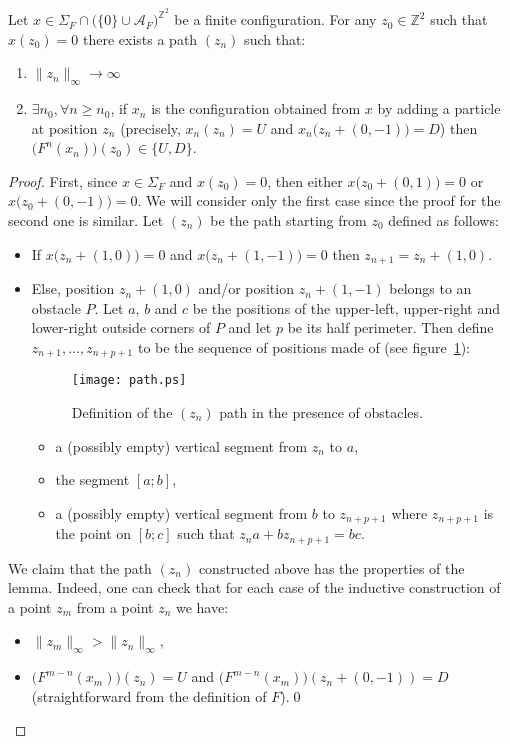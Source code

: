 \documentclass{llncs}
\newcommand{\zz}{{\mathbb{Z}^2}}
\newcommand{\A}{\mathcal{A}}
\newcommand{\acf}{F}
\newcommand{\obst}{\Sigma_{\acf}}
\newcommand{\obstset}{\A_F}
\begin{document}
\begin{lemma}
  \label{lem:partattack}
  Let ${x\in\obst\cap\bigl(\{0\}\cup\obstset\bigr)^\zz}$ be a finite
  configuration. For any $z_0\in\zz$ such that $x(z_0)=0$ there exists
  a path ${(z_n)}$ such that:
  \begin{enumerate}
  \item ${\|z_n\|_\infty\rightarrow\infty}$
  \item ${\exists n_0,\forall n\geq n_0}$, if $x_n$ is the
    configuration obtained from $x$ by adding a particle at position
    $z_n$ (precisely, ${x_n(z_n)=U}$ and
    ${x_n\bigl(z_n+(0,-1)\bigr)=D}$) then
    ${\bigl(\acf^n(x_n)\bigr)(z_0)\in\{U,D\}}$.
  \end{enumerate}
\end{lemma}
\begin{proof}
  First, since $x\in\obst$ and $x(z_0)=0$, then either
  ${x\bigl(z_0+(0,1)\bigr)=0}$ or ${x\bigl(z_0+(0,-1)\bigr)=0}$. We
  will consider only the first case since the proof for the second one
  is similar. Let $(z_n)$ be the path starting from $z_0$ defined as
  follows:
  \begin{itemize}
  \item If $x\bigl(z_n+(1,0)\bigr)=0$ and $x\bigl(z_n+(1,-1)\bigr)=0$ then ${z_{n+1}=z_n+(1,0)}$.
  \item Else, position $z_n+(1,0)$ and/or position $z_n+(1,-1)$
    belongs to an obstacle $P$.  Let $a$, $b$ and $c$ be the positions
    of the upper-left, upper-right and lower-right outside corners of
    $P$ and let $p$ be its half perimeter. Then define
    ${z_{n+1},\ldots,z_{n+p+1}}$ to be the sequence of positions made
    of (see figure~\ref{fig:thepath}):

    \begin{figure}
      \centering
      \texttt{[image: path.ps]}
      \caption{Definition of the $(z_n)$ path in the presence of obstacles.}
      \label{fig:thepath}
    \end{figure}
    \begin{itemize}
    \item a (possibly empty) vertical segment from $z_n$ to $a$,
    \item the segment $[a;b]$,
    \item a (possibly empty) vertical segment from $b$ to $z_{n+p+1}$
      where $z_{n+p+1}$ is the point on $[b;c]$ such that ${z_na +
        bz_{n+p+1}=bc}$.
    \end{itemize}
  \end{itemize}
  We claim that the path $(z_n)$ constructed above has the properties
  of the lemma. Indeed, one can check that for each case of the
  inductive construction of a point $z_m$ from a point $z_n$ we have:
  \begin{itemize}
  \item ${\|z_m\|_\infty>\|z_n\|_\infty}$,
  \item ${\bigl(\acf^{m-n}(x_m)\bigr)(z_n)=U}$ and
    ${\bigl(\acf^{m-n}(x_m)\bigr)(z_n+(0,-1))=D}$ (straightforward from
    the definition of $\acf$).\qed
  \end{itemize}
\end{proof}
\end{document}
